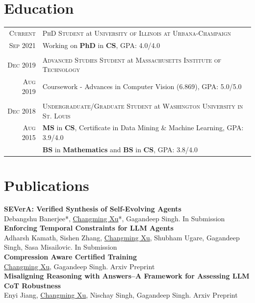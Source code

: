 \documentclass[a4paper,10pt]{article}
\begin{document}
\section{Education}
\begin{tabular}{r|p{11cm}}
 \textsc{Current} & \textsc{PhD Student} at \textsc{University of Illinois at Urbana-Champaign}\\
 \textsc{Sep 2021} & \small{Working on \textbf{PhD} in \textbf{CS}, GPA: 4.0/4.0}\\\multicolumn{2}{c}{} \\
 \textsc{Dec 2019} & \textsc{Advanced Studies Student} at \textsc{Massachusetts Institute of Technology} \\
 \textsc{Aug 2019} & \small{Coursework - Advances in Computer Vision (6.869), GPA: 5.0/5.0}\\\multicolumn{2}{c}{} \\
 \textsc{Dec 2018} & \textsc{Undergraduate/Graduate Student} at \textsc{Washington University in St. Louis} \\
 \textsc{Aug 2015} & \small{\textbf{MS} in \textbf{CS}, Certificate in Data Mining \& Machine Learning, GPA: 3.9/4.0}\\
 & \small{\textbf{BS} in \textbf{Mathematics} and \textbf{BS} in \textbf{CS}, GPA: 3.8/4.0}\\
\end{tabular}

\section{Publications}
\textbf{SEVerA: Verified Synthesis of Self-Evolving Agents}\\
Debangshu Banerjee*, \underline{Changming Xu}*, Gagandeep Singh. In Submission\\[-8pt]

\textbf{Enforcing Temporal Constraints for LLM Agents}\\
Adharsh Kamath, Sishen Zhang, \underline{Changming Xu}, Shubham Ugare, Gagandeep Singh, Sasa Misailovic. In Submission\\[-8pt]

\textbf{Compression Aware Certified Training}\\
\underline{Changming Xu}, Gagandeep Singh. Arxiv Preprint\\[-8pt]

\textbf{Misaligning Reasoning with Answers--A Framework for Assessing LLM CoT Robustness}\\
Enyi Jiang, \underline{Changming Xu}, Nischay Singh, Gagandeep Singh. Arxiv Preprint\\[-8pt]
\end{document}
